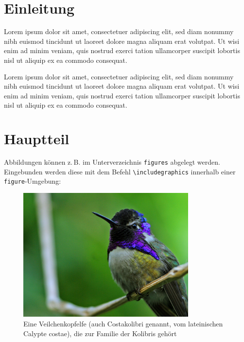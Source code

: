 




\tableofcontents

\clearpage
{}

\section{Einleitung}
\label{sec:Einleitung}
Lorem ipsum dolor sit amet, consectetuer adipiscing elit, sed diam nonummy nibh euismod tincidunt ut laoreet dolore magna aliquam erat volutpat. Ut wisi enim ad minim veniam, quis nostrud exerci tation ullamcorper suscipit lobortis nisl ut aliquip ex ea commodo consequat. \cite[993]{Konak2006} \cite[1--5]{Sailer2013}

Lorem ipsum dolor sit amet, consectetuer adipiscing elit, sed diam nonummy nibh euismod tincidunt ut laoreet dolore magna aliquam erat volutpat. Ut wisi enim ad minim veniam, quis nostrud exerci tation ullamcorper suscipit lobortis nisl ut aliquip ex ea commodo consequat. \cite[995 \psq]{Konak2006}

\section{Hauptteil}
\label{sec:Hauptteil}

Abbildungen können z.\,B. im Unterverzeichnis \texttt{figures} abgelegt werden.
Eingebunden werden diese mit dem Befehl \texttt{\textbackslash includegraphics} innerhalb
einer \texttt{figure}-Umgebung:
\begin{figure}[htb]
  \centering
  \includegraphics[width=0.8\textwidth]{figures/Hummingbird.jpg}
  \caption{Eine Veilchenkopfelfe (auch Costakolibri genannt, vom lateinischen Calypte costae), die zur Familie der Kolibris gehört \cite{Kolibri}}
  \label{fig:kolibri}
\end{figure}

